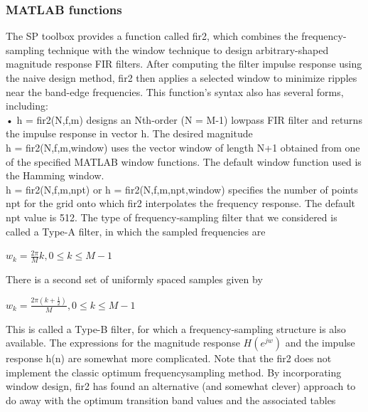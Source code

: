 \documentclass{article}
\begin{document}
\subsubsection{MATLAB functions}
The SP toolbox provides a function called fir2, which combines
the frequency-sampling technique with the window technique to design
arbitrary-shaped magnitude response FIR filters. After computing the filter impulse response using the naive design method, fir2 then applies a
selected window to minimize ripples near the band-edge frequencies. This
function's syntax also has several forms, including: \\
\vspace{1em}
• h = fir2(N,f,m) designs an Nth-order (N = M-1) lowpass FIR filter
and returns the impulse response in vector h. The desired magnitude \\
\vspace{1em}
h = fir2(N,f,m,window) uses the vector window of length N+1 obtained from one of the specified MATLAB window functions. The default window function used is the Hamming window. \\
\vspace{1em}
h = fir2(N,f,m,npt) or h = fir2(N,f,m,npt,window) specifies the
number of points npt for the grid onto which fir2 interpolates the
frequency response. The default npt value is 512. The type of frequency-sampling filter that we considered is called a
Type-A filter, in which the sampled frequencies are \\
\begin{center}
$w_k = \frac{2\pi}{M}k, 0 \leq k \leq M -1$
\end{center}
There is a second set of uniformly spaced samples given by
\begin{center}
$w_k = \frac{2\pi(k+\frac{1}{2})}{M}, 0 \leq k \leq M - 1$
\end{center}
This is called a Type-B filter, for which a frequency-sampling structure is
also available. The expressions for the magnitude response $H(e^{jw})$ and the
impulse response h(n) are somewhat more complicated.
\vspace{1em}
Note that the fir2 does not implement the classic optimum frequencysampling method. By incorporating window design, fir2 has found an
alternative (and somewhat clever) approach to do away with the optimum
transition band values and the associated tables
\end{document}
